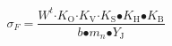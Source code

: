 \begin{equation}
{\sigma }_F\mathrm{=}\frac{W^t\mathrm{\cdot }K_{\mathrm{O}}\mathrm{\cdot }K_{\mathrm{V}}\mathrm{\cdot }K_{\mathrm{S}}\mathrm{\bullet }K_{\mathrm{H}}\mathrm{\bullet }K_{\mathrm{B}}}{b\mathrm{\bullet }m_n\mathrm{\bullet }Y_{\mathrm{J}}}
\end{equation}
